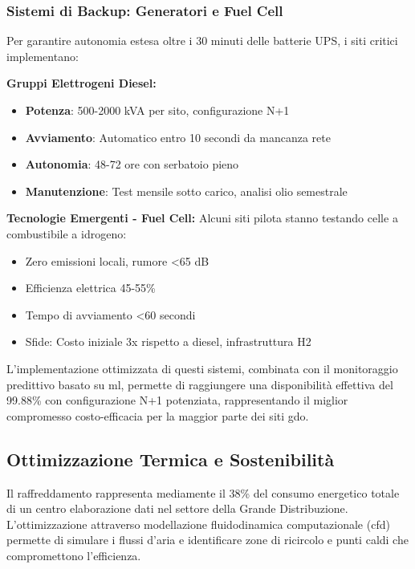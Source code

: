 \subsubsection{\texorpdfstring{Sistemi di Backup: Generatori e Fuel Cell}{3.2.1.4 - Sistemi di Backup: Generatori e Fuel Cell}}

Per garantire autonomia estesa oltre i 30 minuti delle batterie UPS, i siti critici implementano:

\textbf{Gruppi Elettrogeni Diesel:}
\begin{itemize}
    \item \textbf{Potenza}: 500-2000 kVA per sito, configurazione N+1
    \item \textbf{Avviamento}: Automatico entro 10 secondi da mancanza rete
    \item \textbf{Autonomia}: 48-72 ore con serbatoio pieno
    \item \textbf{Manutenzione}: Test mensile sotto carico, analisi olio semestrale
\end{itemize}

\textbf{Tecnologie Emergenti - Fuel Cell:}
Alcuni siti pilota stanno testando celle a combustibile a idrogeno:
\begin{itemize}
    \item Zero emissioni locali, rumore <65 dB
    \item Efficienza elettrica 45-55\%
    \item Tempo di avviamento <60 secondi
    \item Sfide: Costo iniziale 3x rispetto a diesel, infrastruttura H2
\end{itemize}

L'implementazione ottimizzata di questi sistemi, combinata con il monitoraggio predittivo basato su \gls{ml}, permette di raggiungere una disponibilità effettiva del 99.88\% con configurazione N+1 potenziata, rappresentando il miglior compromesso costo-efficacia per la maggior parte dei siti \gls{gdo}.
\subsection{\texorpdfstring{Ottimizzazione Termica e Sostenibilità}{3.2.2 - Ottimizzazione Termica e Sostenibilità}}

Il raffreddamento rappresenta mediamente il 38\% del consumo energetico totale di un centro elaborazione dati nel settore della Grande Distribuzione\autocite{ASHRAE2024}. L'ottimizzazione attraverso modellazione fluidodinamica computazionale (\gls{cfd}) permette di simulare i flussi d'aria e identificare zone di ricircolo e punti caldi che compromettono l'efficienza.

